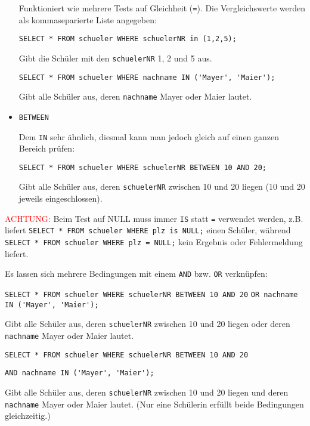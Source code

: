 \begin{itemize}
	Funktioniert wie mehrere Tests auf Gleichheit (\lstinline!=!). Die Vergleichswerte werden als kommaseparierte Liste angegeben:

	\lstinline!SELECT * FROM schueler WHERE schuelerNR in (1,2,5);!

	Gibt die Schüler mit den \lstinline!schuelerNR! 1, 2 und 5 aus.

	\lstinline!SELECT * FROM schueler WHERE nachname IN ('Mayer', 'Maier');!

	Gibt alle Schüler aus, deren \lstinline!nachname! Mayer oder Maier lautet.
	\item \lstinline!BETWEEN!

	Dem \lstinline!IN! sehr ähnlich, diesmal kann man jedoch gleich auf einen ganzen Bereich prüfen:

	\lstinline!SELECT * FROM schueler WHERE schuelerNR BETWEEN 10 AND 20;!

	Gibt alle Schüler aus, deren \lstinline!schuelerNR! zwischen 10 und 20 liegen (10 und 20 jeweils eingeschlossen).
\end{itemize}
\textcolor{red}{ACHTUNG:} Beim Test auf NULL muss immer \lstinline!IS! statt \lstinline!=! verwendet werden, z.B. liefert \lstinline!SELECT * FROM schueler WHERE plz is NULL;! einen Schüler, während \lstinline!SELECT * FROM schueler WHERE plz = NULL;! kein Ergebnis oder Fehlermeldung liefert.

Es lassen sich mehrere Bedingungen mit einem \lstinline!AND! bzw. \lstinline!OR! verknüpfen:

\lstinline!SELECT * FROM schueler WHERE schuelerNR BETWEEN 10 AND 20!
\lstinline!OR nachname IN ('Mayer', 'Maier');!

Gibt alle Schüler aus, deren \lstinline!schuelerNR! zwischen 10 und 20 liegen oder deren \lstinline!nachname! Mayer oder Maier lautet.

\lstinline!SELECT * FROM schueler WHERE schuelerNR BETWEEN 10 AND 20!

\lstinline!AND nachname IN ('Mayer', 'Maier');!

Gibt alle Schüler aus, deren \lstinline!schuelerNR! zwischen 10 und 20 liegen und deren \lstinline!nachname! Mayer oder Maier lautet. (Nur eine Schülerin erfüllt beide Bedingungen gleichzeitig.)

